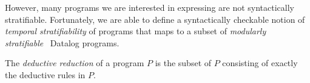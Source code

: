 However, many programs we are interested in expressing are not syntactically
stratifiable.  Fortunately, we are able to define a syntactically checkable
notion of {\em temporal stratifiability} of \slang programs that maps to a
subset of {\em modularly stratifiable}~\cite{modular} Datalog programs.



%
%

%

%
%

%
%


\begin{definition} 
%
The \emph{deductive reduction} of a \slang program $P$ is
the subset of $P$ consisting of exactly the deductive rules in $P$.
%
\end{definition}

